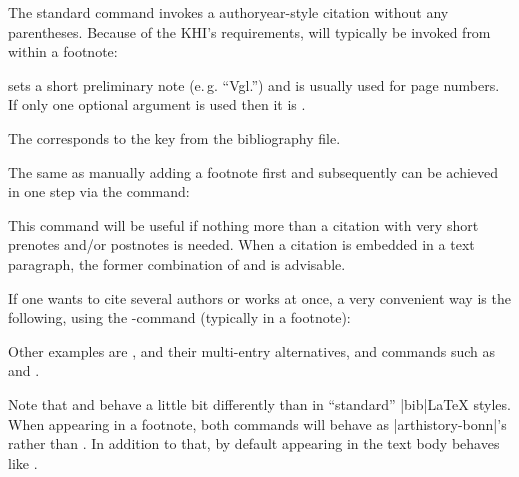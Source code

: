 \documentclass[a4paper,
10pt,
ngerman,
english
]{ltxdoc}
\begin{document}
\DescribeMacro{\cite}%
The standard  command invokes a authoryear-style citation without any parentheses. Because of the KHI's requirements,  will typically be invoked from within a footnote:

 sets a short preliminary note (e.\,g. \enquote{Vgl.}) and  is usually used for page numbers.
If only one optional argument is used then it is .
The  corresponds to the key from the bibliography file.

\DescribeMacro{\footcite}
The same as manually adding a footnote first and  subsequently can be achieved in one step via the  command:
This command will be useful if nothing more than a citation with very short prenotes and/or postnotes is needed. When a citation is embedded in a text paragraph, the former combination of  and  is advisable.

\DescribeMacro{\cites}
If one wants to cite several authors or works at once, a very convenient way is the following, using the -command (typically in a footnote):
Other examples are , and their multi-entry alternatives, and commands such as  and .

Note that  and  behave a little bit differently than in \enquote{standard} |bib|\LaTeX{} styles. When appearing in a footnote, both commands will behave as |arthistory-bonn|'s  rather than . In addition to that, by default  appearing in the text body behaves like .
\end{document}
